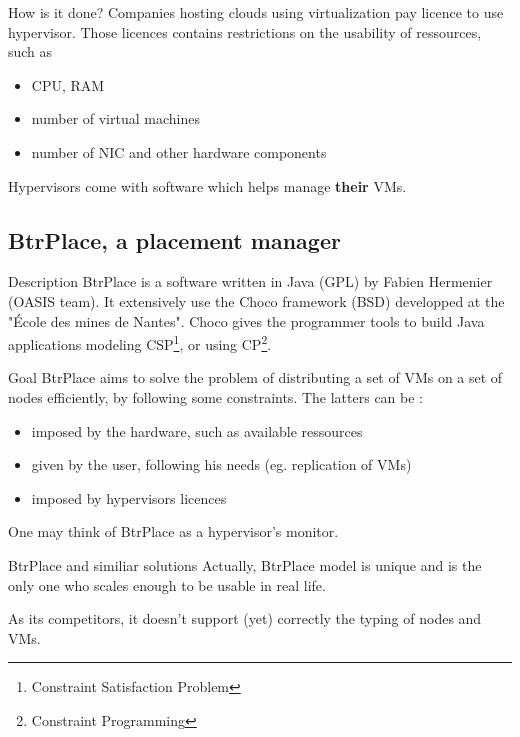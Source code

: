 \documentclass{beamer}
\begin{document}
\begin{frame}{How is it done?}
Companies hosting clouds using virtualization pay licence to use
hypervisor. Those licences contains restrictions on the usability
of ressources, such as
\begin{itemize}
	\item CPU, RAM
	\item number of virtual machines
	\item number of NIC and other hardware components
\end{itemize}

Hypervisors come with software which helps manage \textbf{their} VMs.
\end{frame}

\subsection{BtrPlace, a placement manager}
\begin{frame}{Description}
BtrPlace is a software written in Java (GPL) by Fabien Hermenier
(OASIS team). It extensively use the Choco framework (BSD) developped
at the "École des mines de Nantes". Choco gives the programmer tools
to build Java applications modeling
CSP\footnote{Constraint Satisfaction Problem}, or using
CP\footnote{Constraint Programming}.
\end{frame}
\begin{frame}{Goal}
BtrPlace aims to solve the problem of distributing a set of VMs on
a set of nodes efficiently, by following some constraints. The latters
can be :
\begin{itemize}
	\item imposed by the hardware, such as available ressources
	\item given by the user, following his needs (eg. replication
		of VMs)
	\item imposed by hypervisors licences
\end{itemize}

One may think of BtrPlace as a hypervisor's monitor.

\end{frame}
\begin{frame}{BtrPlace and similiar solutions}
Actually, BtrPlace model is unique and is the only one who scales
enough to be usable in real life.

As its competitors, it doesn't support (yet) correctly the typing
of nodes and VMs.

\end{frame}
\end{document}
